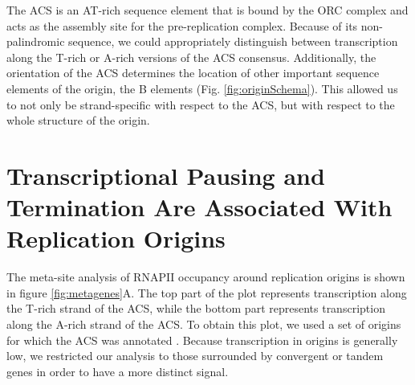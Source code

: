 The ACS is an AT-rich sequence element that is bound by the ORC complex and acts as the assembly site for the pre-replication complex. Because of its non-palindromic sequence, we could appropriately distinguish between transcription along the T-rich or A-rich versions of the ACS consensus. Additionally, the orientation of the ACS determines the location of other important sequence elements of the origin, the B elements (Fig. \ref{fig:originSchema}). This allowed us to not only be strand-specific with respect to the ACS, but with respect to the whole structure of the origin. 

\singlespacing
\section{Transcriptional Pausing and Termination Are Associated With Replication Origins}
\doublespacing

The meta-site analysis of RNAPII occupancy around replication origins is shown in figure \ref{fig:metagenes}A. The top part of the plot represents transcription along the T-rich strand of the ACS, while the bottom part represents transcription along the A-rich strand of the ACS. To obtain this plot, we used a set of origins for which the ACS was annotated \cite{nieduszynski:2006:genomewide}. Because transcription in origins is generally low, we restricted our analysis to those surrounded by convergent or tandem genes in order to have a more distinct signal. 



